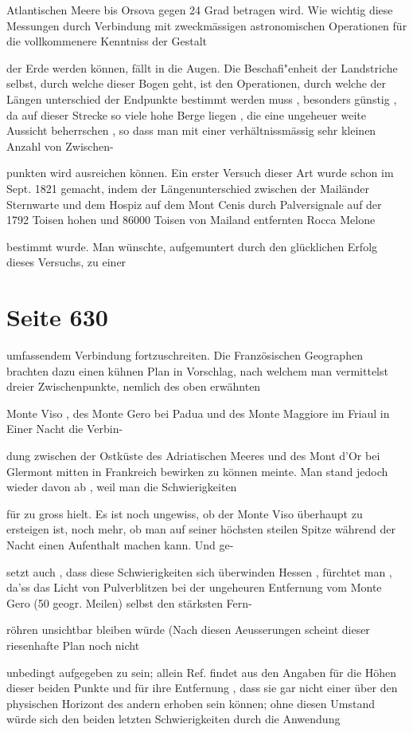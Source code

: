 \documentclass[10pt,a4paper]{article}
\begin{document}
Atlantischen Meere bis Orsova gegen 24 Grad betragen wird. Wie wichtig diese Messungen durch Verbindung mit zweckmässigen astronomischen Operationen für die vollkommenere Kenntniss der Gestalt

der Erde werden können, fällt in die Augen. Die Beschafi"enheit der Landstriche selbst, durch welche dieser Bogen geht, ist den Operationen, durch welche der Längen unterschied der Endpunkte bestimmt werden muss , besonders günstig , da auf dieser Strecke so viele hohe Berge liegen , die eine ungeheuer weite Aussicht beherrschen , so dass man mit einer verhältnissmässig sehr kleinen Anzahl von Zwischen-

punkten wird ausreichen können. Ein erster Versuch dieser Art wurde schon im Sept. 1821 gemacht, indem der Längenunterschied zwischen der Mailänder Sternwarte und dem Hospiz auf dem Mont Cenis durch Palversignale auf der 1792 Toisen hohen und 86000 Toisen von Mailand entfernten Rocca Melone

bestimmt wurde. Man wünschte, aufgemuntert durch den glücklichen Erfolg dieses Versuchs, zu einer


\newpage
\section*{Seite 630}
umfassendem Verbindung fortzuschreiten. Die Französischen Geographen brachten dazu einen kühnen Plan in Vorschlag, nach welchem man vermittelst dreier Zwischenpunkte, nemlich des oben erwähnten

Monte Viso , des Monte Gero bei Padua und des Monte Maggiore im Friaul in Einer Nacht die Verbin-

dung zwischen der Ostküste des Adriatischen Meeres und des Mont d'Or bei Glermont mitten in Frankreich bewirken zu können meinte. Man stand jedoch wieder davon ab , weil man die Schwierigkeiten

für zu gross hielt. Es ist noch ungewiss, ob der Monte Viso überhaupt zu ersteigen ist, noch mehr, ob man auf seiner höchsten steilen Spitze während der Nacht einen Aufenthalt machen kann. Und ge-

setzt auch , dass diese Schwierigkeiten sich überwinden Hessen , fürchtet man , da'ss das Licht von Pulverblitzen bei der ungeheuren Entfernung vom Monte Gero (50 geogr. Meilen) selbst den stärksten Fern-

röhren unsichtbar bleiben würde (Nach diesen Aeusserungen scheint dieser riesenhafte Plan noch nicht

unbedingt aufgegeben zu sein; allein Ref. findet aus den Angaben für die Höhen dieser beiden Punkte und für ihre Entfernung , dass sie gar nicht einer über den physischen Horizont des andern erhoben sein können; ohne diesen Umstand würde sich den beiden letzten Schwierigkeiten durch die Anwendung
\end{document}
